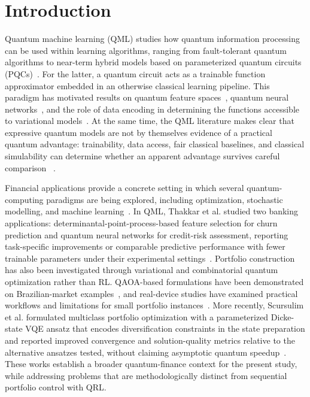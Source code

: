 \documentclass[aps,floatfix,superscriptaddress,twocolumn,tightenlines,amsmath,amssymb,nofootinbib,10pt,longbibliography,prl]{revtex4-2}
\begin{document}
\section{Introduction}
\label{sec:introduction}

Quantum machine learning (QML) studies how quantum information processing can be used within learning algorithms, ranging from fault-tolerant quantum algorithms to near-term hybrid models based on parameterized quantum circuits (PQCs)~\cite{Biamonte2017Quantummachinelear,Benedetti2019Parameterizedquant,Cerezo2021Variationalquantum}.
For the latter, a quantum circuit acts as a trainable function approximator embedded in an otherwise classical learning pipeline. This paradigm has motivated results on quantum feature spaces~\cite{Schuld2019QuantumMachineLear,Havlek2019Supervisedlearning}, quantum
neural networks~\cite{Abbas2021Thepowerofquantumn}, and the role of data encoding in
determining the functions accessible to variational models~\cite{Schuld2021Effectofdataencodi}. At the same time, the QML literature makes clear
that expressive quantum models are not by themselves evidence of a practical quantum
advantage: trainability, data access, fair classical baselines, and classical simulability can determine whether an apparent advantage survives careful comparison ~\cite{Huang2021Powerofdatainquant,Tang2022Dequantizingalgori,McClean2018Barrenplateausinqu}.

Financial applications provide a concrete setting in which several quantum-computing
paradigms are being explored, including optimization, stochastic modelling, and machine
learning~\cite{Orus2019QuantumFinance,Herman2023QuantumFinance}. In QML, Thakkar et al.
studied two banking applications: determinantal-point-process-based feature selection for
churn prediction and quantum neural networks for credit-risk assessment, reporting
task-specific improvements or comparable predictive performance with fewer trainable
parameters under their experimental settings~\cite{Thakkar2024FinancialForecasting}.
Portfolio construction has also been investigated through variational and combinatorial
quantum optimization rather than RL. QAOA-based formulations have been demonstrated on
Brazilian-market examples~\cite{Canabarro2022QuantumFinance}, and real-device studies have
examined practical workflows and limitations for small portfolio
instances~\cite{Buonaiuto2023Portfolio}. More recently, Scursulim et al. formulated
multiclass portfolio optimization with a parameterized Dicke-state VQE ansatz that encodes
diversification constraints in the state preparation and reported improved convergence and
solution-quality metrics relative to the alternative ansatzes tested, without claiming
asymptotic quantum speedup~\cite{Scursulim2026MulticlassPortfolio}. These works establish a
broader quantum-finance context for the present study, while addressing problems that are
methodologically distinct from sequential portfolio control with QRL.
\end{document}
